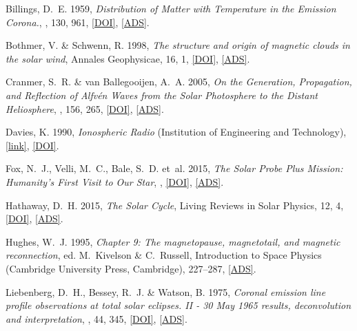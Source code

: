 
	{Billings}, D.~E. 1959, \emph{{Distribution of Matter with Temperature in the
	Emission Corona.}}, \apj, 130, 961,
	\href{http://dx.doi.org/10.1086/146785}{[DOI]},
	\href{http://adsabs.harvard.edu/abs/1959ApJ...130..961B}{[ADS]}.

	{Bothmer}, V. \& {Schwenn}, R. 1998, \emph{{The structure and origin of magnetic clouds in the solar
	wind}}, Annales Geophysicae, 16, 1,
	\href{http://dx.doi.org/10.1007/s00585-997-0001-x}{[DOI]},
	\href{http://adsabs.harvard.edu/abs/1998AnGeo..16....1B}{[ADS]}.

	{Cranmer}, S.~R. \& {van Ballegooijen}, A.~A. 2005, \emph{{On the Generation,
	Propagation, and Reflection of Alfv{\'e}n Waves from the Solar Photosphere to
	the Distant Heliosphere}}, \apjs, 156, 265,
	\href{http://dx.doi.org/10.1086/426507}{[DOI]},
	\href{http://adsabs.harvard.edu/abs/2005ApJS..156..265C}{[ADS]}.

	Davies, K. 1990, \emph{Ionospheric Radio} (Institution of Engineering and
	Technology),
	\href{http://digital-library.theiet.org/content/books/ew/pbew031e}{[link]},
	\href{http://dx.doi.org/10.1049/PBEW031E}{[DOI]}.

	{Fox}, N.~J., {Velli}, M.~C., {Bale}, S.~D. {et~al.} 2015, \emph{{The Solar
	Probe Plus Mission: Humanity's First Visit to Our Star}}, \ssr,
	\href{http://dx.doi.org/10.1007/s11214-015-0211-6}{[DOI]},
	\href{http://adsabs.harvard.edu/abs/2015SSRv..tmp..105F}{[ADS]}.

	{Hathaway}, D.~H. 2015, \emph{{The Solar Cycle}}, Living Reviews in Solar
	Physics, 12, 4, \href{http://dx.doi.org/10.1007/lrsp-2015-4}{[DOI]},
	\href{http://adsabs.harvard.edu/abs/2015LRSP...12....4H}{[ADS]}.

	{Hughes}, W.~J. 1995, \emph{{Chapter 9: The magnetopause, magnetotail, and
	magnetic reconnection}}, ed. M.~Kivelson \& C.~Russell, Introduction to Space
	Physics (Cambridge University Press, Cambridge), 227--287,
	\href{http://adsabs.harvard.edu/abs/1995isp..book.....K}{[ADS]}.
	
	{Liebenberg}, D.~H., {Bessey}, R.~J. \& {Watson}, B. 1975, \emph{{Coronal
	emission line profile observations at total solar eclipses. II - 30 May 1965
	results, deconvolution and interpretation}}, \solphys, 44, 345,
	\href{http://dx.doi.org/10.1007/BF00153213}{[DOI]},
	\href{http://adsabs.harvard.edu/abs/1975SoPh...44..345L}{[ADS]}.

